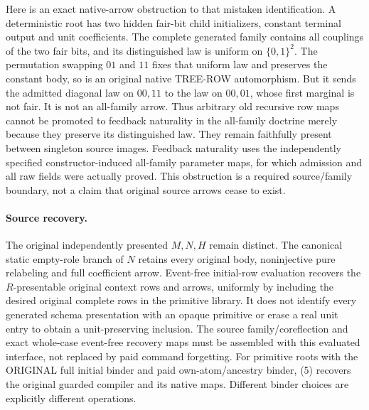 \documentclass[11pt]{article}
\begin{document}
Here is an exact native-arrow obstruction to that mistaken identification. A deterministic root has two hidden fair-bit child initializers, constant terminal output and unit coefficients. The complete generated family contains all couplings of the two fair bits, and its distinguished law is uniform on $\{0,1\}^2$. The permutation swapping $01$ and $11$ fixes that uniform law and preserves the constant body, so is an original native TREE-ROW automorphism. But it sends the admitted diagonal law on $00,11$ to the law on $00,01$, whose first marginal is not fair. It is not an all-family arrow. Thus arbitrary old recursive row maps cannot be promoted to feedback naturality in the all-family doctrine merely because they preserve its distinguished law. They remain faithfully present between singleton source images. Feedback naturality uses the independently specified constructor-induced all-family parameter maps, for which admission and all raw fields were actually proved. This obstruction is a required source/family boundary, not a claim that original source arrows cease to exist.

\paragraph{Source recovery.}
The original independently presented $M,N,H$ remain distinct. The canonical static empty-role branch of $N$ retains every original body, noninjective pure relabeling and full coefficient arrow. Event-free initial-row evaluation recovers the $R$-presentable original context rows and arrows, uniformly by including the desired original complete rows in the primitive library. It does not identify every generated schema presentation with an opaque primitive or erase a real unit entry to obtain a unit-preserving inclusion. The source family/coreflection and exact whole-case event-free recovery maps must be assembled with this evaluated interface, not replaced by paid command forgetting. For primitive roots with the ORIGINAL full initial binder and paid own-atom/ancestry binder, (5) recovers the original guarded compiler and its native maps. Different binder choices are explicitly different operations.
\end{document}
